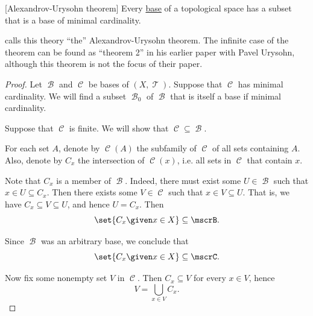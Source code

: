 \begin{theorem}\label{thm:base_has_subset_of_minimal_weight}[Alexandrov-Urysohn theorem]
  Every \hyperref[def:topological_base]{base} of a topological space has a subset that is a base of minimal cardinality.
\end{theorem}
\begin{comments}
  \item \Textcite{Александров1977ОбщаяТопология} calls this theory \enquote{the} Alexandrov-Urysohn theorem. The infinite case of the theorem can be found as \enquote{theorem 2} in his earlier paper \cite{АлександровУрысон1950КомпактныеПространства} with Pavel Urysohn, although this theorem is not the focus of their paper.
\end{comments}
\begin{proof}
  Let \( \mscrB \) and \( \mscrC \) be bases of \( (X, \mscrT) \). Suppose that \( \mscrC \) has minimal cardinality. We will find a subset \( \mscrB_0 \) of \( \mscrB \) that is itself a base if minimal cardinality.

   Suppose that \( \mscrC \) is finite. We will show that \( \mscrC \subseteq \mscrB \).

  For each set \( A \), denote by \( \mscrC(A) \) the subfamily of \( \mscrC \) of all sets containing \( A \). Also, denote by \( C_x \) the intersection of \( \mscrC(x) \), i.e. all sets in \( \mscrC \) that contain \( x \).

  Note that \( C_x \) is a member of \( \mscrB \). Indeed, there must exist some \( U \in \mscrB \) such that \( x \in U \subseteq C_x \). Then there exists some \( V \in \mscrC \) such that \( x \in V \subseteq U \). That is, we have \( C_x \subseteq V \subseteq U \), and hence \( U = C_x \). Then
  \begin{equation*}
    \set{ C_x \given x \in X } \subseteq \mscrB.
  \end{equation*}

  Since \( \mscrB \) was an arbitrary base, we conclude that
  \begin{equation*}
    \set{ C_x \given x \in X } \subseteq \mscrC.
  \end{equation*}

  Now fix some nonempty set \( V \) in \( \mscrC \). Then \( C_x \subseteq V \) for every \( x \in V \), hence
  \begin{equation*}
    V = \bigcup_{x \in V} C_x.
  \end{equation*}


\end{proof}
